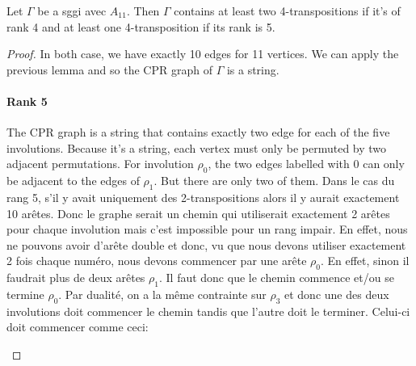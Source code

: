 \begin{lemma}
  Let $\Gamma$ be a sggi avec $A_{11}$. Then $\Gamma$ contains at least two 4-transpositions if it's of rank 4 and at least one 4-transposition if its rank is 5.
\end{lemma}

\begin{proof}
  In both case, we have exactly 10 edges for 11 vertices. We can apply the previous lemma and so the CPR graph of $\Gamma$ is a string.

  \paragraph{Rank 5}
  The CPR graph is a string that contains exactly two edge for each of the five involutions. Because it's a string, each vertex must only be permuted by two adjacent permutations. For involution $\rho_0$, the two edges labelled with 0 can only be adjacent to the edges of $\rho_1$. But there are only two of them.
  Dans le cas du rang 5, s'il y avait uniquement des 2-transpositions alors il y aurait exactement 10 arêtes. Donc le graphe serait un chemin qui utiliserait exactement 2 arêtes pour chaque involution mais c'est impossible pour un rang impair. En effet, nous ne pouvons avoir d'arête double et donc, vu que nous devons utiliser exactement 2 fois chaque numéro, nous devons commencer par une arête $\rho_0$. En effet, sinon il faudrait plus de deux arêtes $\rho_1$. Il faut donc que le chemin commence et/ou se termine $\rho_0$. Par dualité, on a la même contrainte sur $\rho_3$ et donc une des deux involutions doit commencer le chemin tandis que l'autre doit le terminer. Celui-ci doit commencer comme ceci:

  \begin{figure}[H]
    \begin{center}
\end{center}
\end{figure}
\end{proof}
